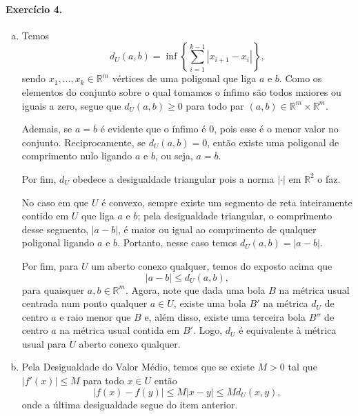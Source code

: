 \documentclass[12pt,a4paper]{article}
\newcommand{\R}{\mathbb{R}}
\begin{document}
\paragraph{Exercício 4.}
    \begin{enumerate}[a)]
        \item Temos
        \begin{equation*}
            d_U(a,b) = \inf\left\{ \sum_{i=1}^{k-1} |x_{i+1} - x_i| \right\},
        \end{equation*}
        sendo $x_1, \dots, x_k\in\R^m$ vértices de uma poligonal que liga
        $a$ e $b$. Como os elementos do conjunto sobre o qual tomamos o ínfimo
        são todos maiores ou iguais a zero, segue que $d_U(a,b) \geq 0$ para
        todo par $(a,b)\in\R^m\times\R^m$.
        
        Ademais, se $a=b$ é evidente que o ínfimo é $0$, pois esse é o menor
        valor no conjunto. Reciprocamente, se
        $d_U(a,b) = 0$, então existe uma poligonal de comprimento nulo ligando
        $a$ e $b$, ou seja, $a=b$.
        
        Por fim, $d_U$ obedece a desigualdade triangular pois a norma $|\cdot|$
        em $\R^2$ o faz.
        
        No caso em que $U$ é convexo, sempre existe um segmento de reta inteiramente
        contido em $U$ que liga $a$ e $b$; pela desigualdade triangular,
        o comprimento desse segmento, $|a-b|$, é maior ou igual ao comprimento de
        qualquer poligonal ligando $a$ e $b$. Portanto, nesse caso temos
        $d_U(a,b) = |a-b|$.
        
        Por fim, para $U$ um aberto conexo qualquer, temos do exposto acima que
        \begin{equation*}
            |a-b| \leq d_U(a,b),
        \end{equation*}
        para quaisquer $a,b\in\R^m$. Agora, note que dada uma bola $B$ na métrica usual
        centrada num ponto qualquer $a\in U$, existe uma bola $B'$ na métrica $d_U$ de centro 
        $a$ e raio menor que $B$ e, além disso, existe uma terceira bola $B''$ de centro
        $a$ na métrica usual contida em $B'$. Logo, $d_U$ é equivalente à métrica usual
        para $U$ aberto conexo qualquer.
        
        \item Pela Desigualdade do Valor Médio, temos que se existe $M > 0$
        tal que $|f'(x)| \leq M$
        para todo $x\in U$ então
        \begin{equation*}
            |f(x) - f(y)| \leq M|x-y| \leq M d_U(x,y),
        \end{equation*}
        onde a última desigualdade segue do item anterior.
        

\end{enumerate}
\end{document}
